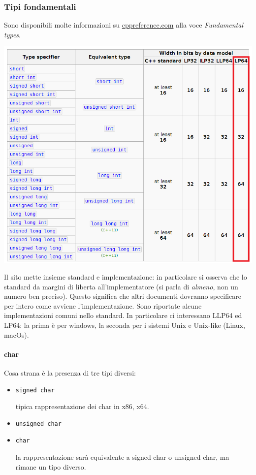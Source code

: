 \documentclass[11pt]{report}
\theoremstyle{definition}
\begin{document}
\subsubsection{Tipi fondamentali} 
Sono disponibili molte informazioni su \url{cppreference.com} alla voce \emph{Fundamental types}.
\begin{center}
\includegraphics[scale=0.90]{img/13.PNG}
\end{center} 
Il sito mette insieme standard e implementazione: in particolare si osserva che lo standard da margini di liberta all'implementatore (si parla di \emph{almeno}, non un numero ben preciso). Questo significa che altri documenti dovranno specificare per intero come avviene l'implementazione. Sono riportate alcune implementazioni comuni nello standard. In particolare ci interessano LLP64 ed LP64: la prima è per windows, la seconda per i sistemi Unix e Unix-like (Linux, macOs).
\clearpage 

\paragraph{char} Cosa strana è la presenza di tre tipi diversi:
\begin{itemize}
\item \begin{verbatim}
signed char
\end{verbatim}
tipica rappresentazione dei char in x86, x64.
\item \begin{verbatim}
unsigned char
\end{verbatim}
\item \begin{verbatim}
char
\end{verbatim}
la rappresentazione sarà equivalente a signed char o unsigned char, ma rimane un tipo diverso.
\end{itemize}
\end{document}
